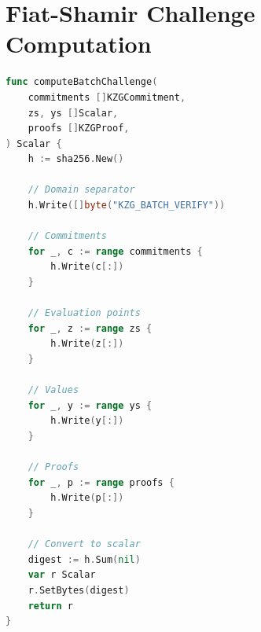 \documentclass[11pt,a4paper]{article}
\theoremstyle{definition}
\begin{document}
\section{Fiat-Shamir Challenge Computation}

\begin{lstlisting}[language=Go, caption={Batch Challenge Computation}]
func computeBatchChallenge(
    commitments []KZGCommitment,
    zs, ys []Scalar,
    proofs []KZGProof,
) Scalar {
    h := sha256.New()

    // Domain separator
    h.Write([]byte("KZG_BATCH_VERIFY"))

    // Commitments
    for _, c := range commitments {
        h.Write(c[:])
    }

    // Evaluation points
    for _, z := range zs {
        h.Write(z[:])
    }

    // Values
    for _, y := range ys {
        h.Write(y[:])
    }

    // Proofs
    for _, p := range proofs {
        h.Write(p[:])
    }

    // Convert to scalar
    digest := h.Sum(nil)
    var r Scalar
    r.SetBytes(digest)
    return r
}
\end{lstlisting}
\end{document}
